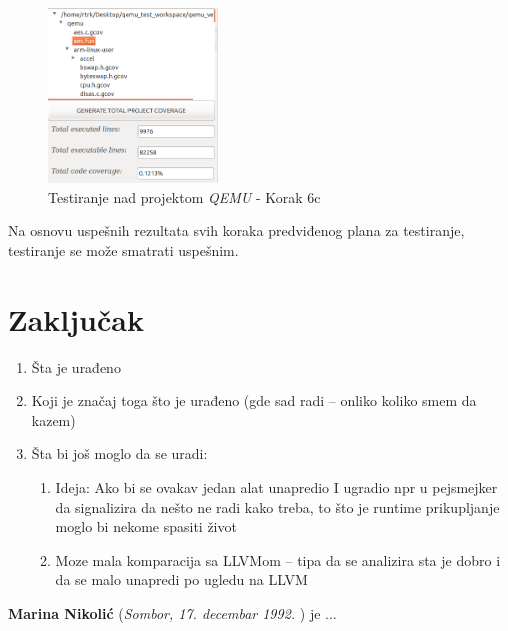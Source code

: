 \documentclass[12pt,oneside]{memoir}
\newcommand{\strano}[1]{\textit{#1}}
\begin{document}
\begin{figure}[!ht]
  \centering
  \includegraphics[width=0.4\textwidth]{img/qemu-test-6c.png}
  \caption{Testiranje nad projektom \strano{QEMU} - Korak 6c}
  \label{fig:qemu-test-6c}
\end{figure} 

Na osnovu uspešnih rezultata svih koraka predviđenog plana za testiranje, testiranje se može smatrati uspešnim.


\chapter{Zaključak}


\begin{enumerate}
\item Šta je urađeno
\item Koji je značaj toga što je urađeno (gde sad radi – onliko koliko smem da kazem)
\item Šta bi još moglo da se uradi:
\begin{enumerate}
\item Ideja: Ako bi se ovakav jedan alat unapredio I ugradio npr u pejsmejker da signalizira da nešto ne radi kako treba, to što je runtime prikupljanje moglo bi nekome spasiti život
\item Moze mala komparacija sa LLVMom – tipa da se analizira sta je dobro i da se malo unapredi po ugledu na LLVM
\end{enumerate}
\end{enumerate}



\literatura

\backmatter

\begin{biografija}
  \textbf{Marina Nikolić} (\emph{Sombor,
    17. decembar 1992. }) je ... 
\end{biografija}
\end{document}
